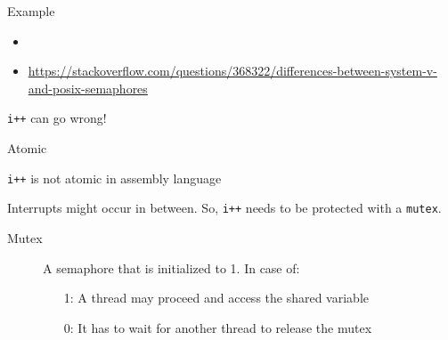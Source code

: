\begin{frame}{Example}%
  \begin{center}
  \end{center}
\end{frame}

\begin{itemize}
\item {}
\item \url{https://stackoverflow.com/questions/368322/differences-between-system-v-and-posix-semaphores}
\end{itemize}

\begin{frame}{\texttt{i++} {\small can go wrong!}}
\begin{center}
\end{center}
\end{frame}

\begin{frame}{Atomic}
  \begin{block}{\texttt{i++} is not atomic in assembly language}
    \begin{center}
    \end{center}
  \end{block}
  Interrupts might occur in between. So, \texttt{i++} needs to be protected with a \texttt{mutex}.
\end{frame}

\begin{frame}
  \begin{description}
  \item[Mutex] A semaphore that is initialized to 1. In case of:
    \begin{itemize}
    \item[1:] A thread may proceed and access the shared variable
    \item[0:] It has to wait for another thread to release the mutex
    \end{itemize}
  \end{description}
  \begin{center}
  \end{center}
\end{frame}

